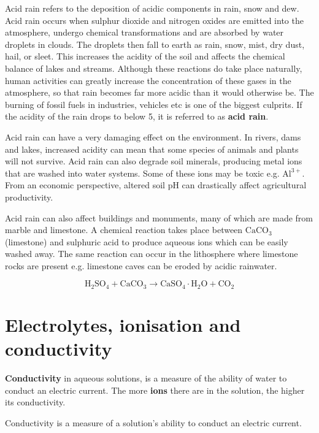 \begin{enumerate}[noitemsep, label=\textbf{\arabic*}. ]
\label{m38720*fhsst!!!underscore!!!id5341}
 { \label{m38720*meaningfhsst!!!underscore!!!id5341}
       Acid rain refers to the deposition of acidic components in rain, snow and dew. Acid rain occurs when sulphur dioxide and nitrogen oxides are emitted into the atmosphere, undergo chemical transformations and are absorbed by water droplets in clouds. The droplets then fall to earth as rain, snow, mist, dry dust, hail, or sleet. This increases the acidity of the soil and affects the chemical balance of lakes and streams. 
         } 
\label{m38720*id338300}Although these reactions do take place naturally, human activities can greatly increase the concentration of these gases in the atmosphere, so that rain becomes far more acidic than it would otherwise be. The burning of fossil fuels in industries, vehicles etc is one of the biggest culprits. If the acidity of the rain drops to below 5, it is referred to as \textbf{acid rain}.\par 
        \label{m38720*id338311}Acid rain can have a very damaging effect on the environment. In rivers, dams and lakes, increased acidity can mean that some species of animals and plants will not survive. Acid rain can also degrade soil minerals, producing metal ions that are washed into water systems. Some of these ions may be toxic e.g. ${\mathrm{Al}}^{3+}$. From an economic perspective, altered soil pH can drastically affect agricultural productivity.\par 
        \label{m38720*id338337}Acid rain can also affect buildings and monuments, many of which are made from marble and limestone. A chemical reaction takes place between ${\mathrm{CaCO}}_{3}$ (limestone) and sulphuric acid to produce aqueous ions which can be easily washed away. The same reaction can occur in the lithosphere where limestone rocks are present e.g. limestone caves can be eroded by acidic rainwater.
        \label{m38720*id7435}\nopagebreak\noindent{}
        
    \begin{equation}
    {\mathrm{H}}_{2}{\mathrm{SO}}_{4}+{\mathrm{CaCO}}_{3}\to {\mathrm{CaSO}}_{4}\ensuremath{\cdot}\mathrm{H}{}_{2}\mathrm{O}+{\mathrm{CO}}_{2}\tag{17.2}
      \end{equation}
\par 
\end{enumerate}
    \label{m38720*cid7}
            \section{Electrolytes, ionisation and conductivity}
            \nopagebreak
      \label{m38720*id338608}\textbf{Conductivity} in aqueous solutions, is a measure of the ability of water to conduct an electric current. The more \textbf{ions} there are in the solution, the higher its conductivity.\par 
\label{m38720*fhsst!!!underscore!!!id635}
 { \label{m38720*meaningfhsst!!!underscore!!!id635}
      Conductivity is a measure of a solution's ability to conduct an electric current.
       } 
      \label{m38720*uid52}
